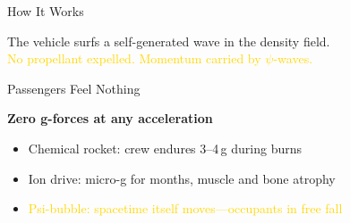 \documentclass[aspectratio=169,10pt]{beamer}
\begin{document}
\begin{frame}[t,fragile,shrink=5]{How It Works}
\vspace{0.4cm}
\begin{center}
\end{center}
\vspace{0.3cm}
\begin{center}
  \small The vehicle surfs a self-generated wave in the density field.\\
  \small\textcolor{gold}{No propellant expelled. Momentum carried by $\psi$-waves.}
\end{center}
\end{frame}

\begin{frame}[t]{Passengers Feel Nothing}
\vspace{0.8cm}
\begin{center}
  {\LARGE\bfseries Zero g-forces at any acceleration}
\end{center}
\vspace{0.5cm}
\begin{itemize}
  \setlength\itemsep{8pt}
  \item Chemical rocket: crew endures 3--4\,g during burns
  \item Ion drive: micro-g for months, muscle and bone atrophy
  \item \textcolor{gold}{Psi-bubble: spacetime itself moves---occupants in free fall}
\end{itemize}
\end{frame}

\end{document}
